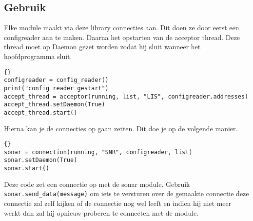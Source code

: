 \documentclass[a4paper,10pt]{article}
\begin{document}
\subsection{Gebruik}
Elke module maakt via deze library connecties aan. Dit doen ze door eerst een configreader aan te maken. Daarna het opstarten van de acceptor thread. Deze thread moet op Daemon gezet worden zodat hij sluit wanneer het hoofdprogramma sluit.
\begin{verbatim}{}
configreader = config_reader()
print("config reader gestart")
accept_thread = acceptor(running, list, "LIS", configreader.addresses)
accept_thread.setDaemon(True)
accept_thread.start()
\end{verbatim}
Hierna kan je de connecties op gaan zetten. Dit doe je op de volgende manier.
\begin{verbatim}{}
sonar = connection(running, "SNR", configreader, list)
sonar.setDaemon(True)
sonar.start()
\end{verbatim}
Deze code zet een connectie op met de sonar module. Gebruik \verb!sonar.send_data(message)! om iets te versturen over de gemaakte connectie deze connectie zal zelf kijken of de connectie nog wel leeft en indien hij niet meer werkt dan zal hij opnieuw proberen te connecten met de module.
\end{document}
